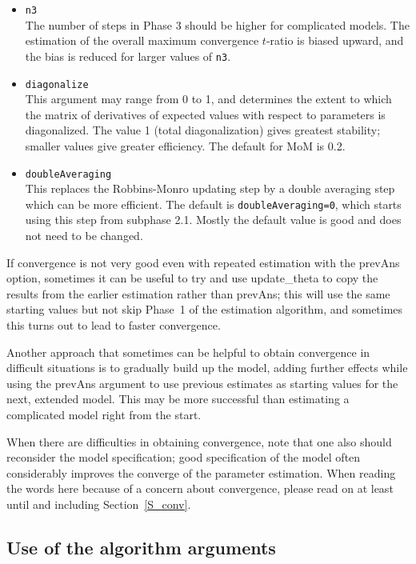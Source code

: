 \documentclass[a4paper,fleqn,11pt]{article}
\newcommand{\+}{\, + \,}
\newcommand{\sfn}[1]{\textsf{#1}}
\begin{document}
\begin{itemize}
     \texttt{firstg}, e.g., 0.01 or 0.05.
\item \texttt{n3}\\
    The number of steps in Phase 3 should be higher for complicated models.
    The estimation of the overall maximum convergence $t$-ratio is biased
    upward, and the bias is reduced for larger values of \texttt{n3}.
\item \texttt{diagonalize}\\
    This argument may range from 0 to 1,
    and determines the extent to which the matrix of derivatives of expected
    values with respect to parameters is diagonalized.
    The value 1 (total diagonalization) gives greatest stability;
    smaller values give greater efficiency.
    The default for MoM is 0.2.
\item \texttt{doubleAveraging}\\
      This replaces the Robbins-Monro updating step by a double averaging
      step \citep{bather1989,SchwabeWalk96,KushnerYin03} which can be
      more efficient. The default is \texttt{doubleAveraging=0}, which starts using
      this step from subphase 2.1.
      Mostly the default value is good and does not need to be changed.
\end{itemize}


If convergence is not very good even with repeated estimation with
the \sfn{prevAns} option, sometimes it can be useful to try and use
\sfn{update\_theta} to copy the results from the earlier estimation
rather than \sfn{prevAns}; this will use the same starting values
but not skip Phase~1 of the estimation algorithm, and sometimes
this turns out to lead to faster convergence.
\medskip

Another approach that sometimes can be helpful to obtain convergence in difficult
situations is to gradually build up the model, adding further effects
while using the \sfn{prevAns} argument to use previous estimates as starting
values for the next, extended model. This may be more successful than
estimating a complicated model right from the start.

When there are difficulties in obtaining convergence, note that one also
should reconsider the model specification; good specification of the model often
considerably improves the converge of the parameter estimation.
When reading the words here because of a concern about convergence,
please read on at least until and including Section~\ref{S_conv}.

\subsection{Use of the algorithm arguments}
\end{document}
